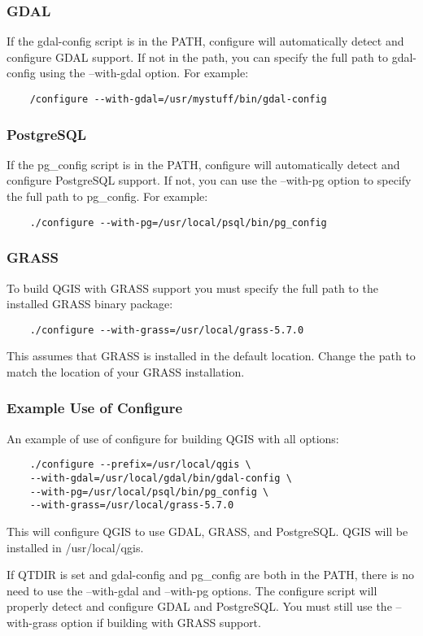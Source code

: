 \documentclass[a4paper,10pt]{article}
\begin{document}
  \subsubsection{GDAL}
  If the gdal-config script is in the PATH, configure will automatically
  detect and configure GDAL support. If not in the path, you can specify
  the full path to gdal-config using the --with-gdal option. For example:
  \begin{verbatim}
    /configure --with-gdal=/usr/mystuff/bin/gdal-config
  \end{verbatim}
  \subsubsection{PostgreSQL}
  If the pg\_config script is in the PATH, configure will automatically
  detect and configure PostgreSQL support. If not, you can use the
  --with-pg option to specify the full path to pg\_config. For example:
  \begin{verbatim}
    ./configure --with-pg=/usr/local/psql/bin/pg_config
  \end{verbatim}
\subsubsection{GRASS}
To build QGIS with GRASS support you must specify the full path to the installed GRASS binary package:
\begin{verbatim}
    ./configure --with-grass=/usr/local/grass-5.7.0
\end{verbatim}
This assumes that GRASS is installed in the default location. Change the path to match the location of your GRASS installation.
  \subsubsection{Example Use of Configure}
  An example of use of configure for building QGIS with all options:
  \begin{verbatim}
    ./configure --prefix=/usr/local/qgis \
    --with-gdal=/usr/local/gdal/bin/gdal-config \
    --with-pg=/usr/local/psql/bin/pg_config \
    --with-grass=/usr/local/grass-5.7.0
  \end{verbatim}
  This will configure QGIS to use GDAL, GRASS, and PostgreSQL. QGIS will be
  installed in /usr/local/qgis.

  If QTDIR is set and gdal-config and pg\_config are both
  in the PATH, there is no need to use the --with-gdal and --with-pg
  options. The configure script will properly detect and configure
  GDAL and PostgreSQL. You must still use the --with-grass option if building with GRASS support.
\end{document}
